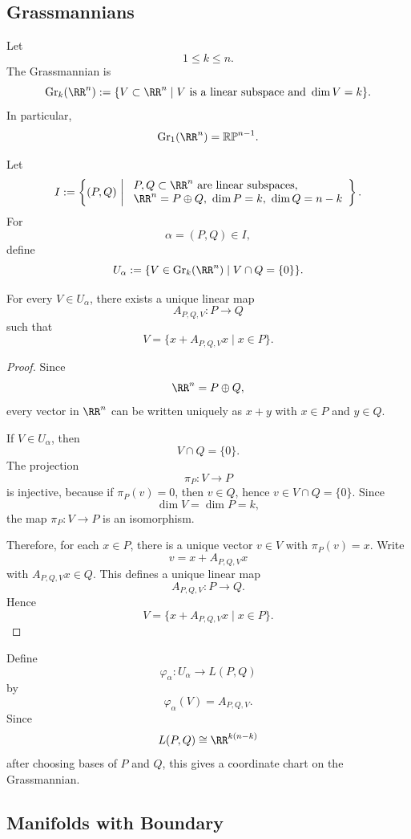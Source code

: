 \subsection{Grassmannians}

\begin{example}[Grassmannians]
Let
\[
  1\le k\le n.
\]
The Grassmannian is
\[
  \operatorname{Gr}_k(\RR^n)
  :=
  \{V\subset \RR^n\mid V \text{ is a linear subspace and } \dim V=k\}.
\]
In particular,
\[
  \operatorname{Gr}_1(\RR^n)=\mathbb{RP}^{n-1}.
\]
\end{example}

Let
\[
  I
  :=
  \left\{
    (P,Q)
    \ \middle|\
    \begin{array}{l}
      P,Q\subset \RR^n \text{ are linear subspaces,}\\
      \RR^n=P\oplus Q,\ \dim P=k,\ \dim Q=n-k
    \end{array}
  \right\}.
\]
For
\[
  \alpha=(P,Q)\in I,
\]
define
\[
  U_\alpha
  :=
  \{V\in \operatorname{Gr}_k(\RR^n)\mid V\cap Q=\{0\}\}.
\]

\begin{lemma}
For every $V\in U_\alpha$, there exists a unique linear map
\[
  A_{P,Q,V}:P\to Q
\]
such that
\[
  V=\{x+A_{P,Q,V}x\mid x\in P\}.
\]
\end{lemma}

\begin{proof}
Since
\[
  \RR^n=P\oplus Q,
\]
every vector in $\RR^n$ can be written uniquely as $x+y$ with $x\in P$ and $y\in Q$.

If $V\in U_\alpha$, then
\[
  V\cap Q=\{0\}.
\]
The projection
\[
  \pi_P:V\to P
\]
is injective, because if $\pi_P(v)=0$, then $v\in Q$, hence $v\in V\cap Q=\{0\}$. Since
\[
  \dim V=\dim P=k,
\]
the map $\pi_P:V\to P$ is an isomorphism.

Therefore, for each $x\in P$, there is a unique vector $v\in V$ with $\pi_P(v)=x$. Write
\[
  v=x+A_{P,Q,V}x
\]
with $A_{P,Q,V}x\in Q$. This defines a unique linear map
\[
  A_{P,Q,V}:P\to Q.
\]
Hence
\[
  V=\{x+A_{P,Q,V}x\mid x\in P\}.
\]
\end{proof}

Define
\[
  \varphi_\alpha:U_\alpha\to L(P,Q)
\]
by
\[
  \varphi_\alpha(V)=A_{P,Q,V}.
\]
Since
\[
  L(P,Q)\cong \RR^{k(n-k)}
\]
after choosing bases of $P$ and $Q$, this gives a coordinate chart on the Grassmannian.

\subsection{Manifolds with Boundary}

